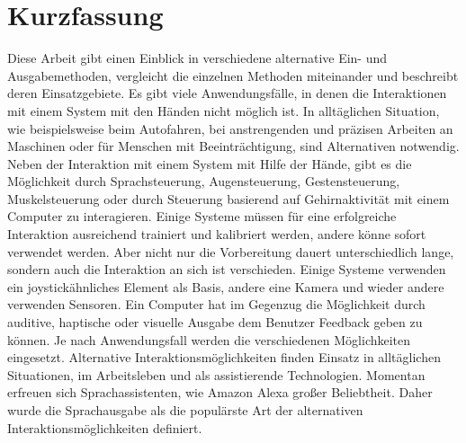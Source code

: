 \chapter{Kurzfassung}
Diese Arbeit gibt einen Einblick in verschiedene alternative Ein- und Ausgabemethoden, vergleicht die einzelnen Methoden miteinander und beschreibt deren Einsatzgebiete.
\newline \newline
Es gibt viele Anwendungsfälle, in denen die Interaktionen mit einem System mit den
Händen nicht möglich ist. In alltäglichen Situation, wie beispielsweise beim Autofahren,
bei anstrengenden und präzisen Arbeiten an Maschinen oder für Menschen mit
Beeinträchtigung, sind Alternativen notwendig.
\newline \newline
Neben der Interaktion mit einem System mit Hilfe der Hände, gibt es die Möglichkeit durch Sprachsteuerung, Augensteuerung, Gestensteuerung, Muskelsteuerung oder durch Steuerung basierend auf Gehirnaktivität mit einem Computer zu interagieren. Einige Systeme müssen für eine erfolgreiche Interaktion ausreichend trainiert und kalibriert werden, andere könne sofort verwendet werden. Aber nicht nur die Vorbereitung dauert unterschiedlich lange, sondern auch die Interaktion an sich ist verschieden. Einige Systeme verwenden ein joystickähnliches Element als Basis, andere eine Kamera und wieder andere verwenden Sensoren.
\newline \newline
Ein Computer hat im Gegenzug die Möglichkeit durch auditive, haptische oder visuelle Ausgabe dem Benutzer Feedback geben zu können. Je nach Anwendungsfall werden die verschiedenen Möglichkeiten eingesetzt.
\newline \newline
Alternative Interaktionsmöglichkeiten finden Einsatz in alltäglichen Situationen, im Arbeitsleben und als assistierende Technologien. Momentan erfreuen sich Sprachassistenten, wie Amazon Alexa großer Beliebtheit. Daher wurde die Sprachausgabe als die populärste Art der alternativen Interaktionsmöglichkeiten definiert.
 
